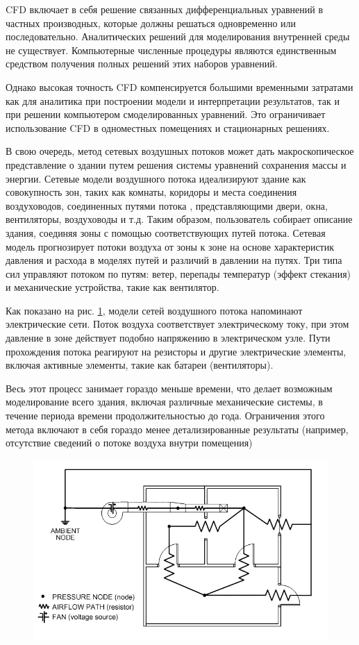 CFD включает в себя решение связанных дифференциальных уравнений в частных производных, которые должны решаться одновременно или последовательно. Аналитических решений для моделирования внутренней среды не существует. Компьютерные численные процедуры являются единственным средством получения полных решений этих наборов уравнений.

Однако высокая точность CFD компенсируется большими временными затратами как для аналитика при построении модели и интерпретации результатов, так и при решении компьютером смоделированных уравнений. Это ограничивает использование CFD в одноместных помещениях и стационарных решениях.

В свою очередь, метод сетевых воздушных потоков может дать макроскопическое представление о здании путем решения системы уравнений сохранения массы и энергии. Сетевые модели воздушного потока идеализируют здание как совокупность зон, таких как комнаты, коридоры и места соединения воздуховодов, соединенных путями потока , представляющими двери, окна, вентиляторы, воздуховоды и т.д. Таким образом, пользователь собирает описание здания, соединяя зоны с помощью соответствующих путей потока. Сетевая модель прогнозирует потоки воздуха от зоны к зоне на основе характеристик давления и расхода в моделях путей и различий в давлении на путях. Три типа сил управляют потоком по путям: ветер, перепады температур (эффект стекания) и механические устройства, такие как вентилятор.

Как показано на рис. \ref{NAF}, модели сетей воздушного потока напоминают электрические сети. Поток воздуха соответствует электрическому току, при этом давление в зоне действует подобно напряжению в электрическом узле. Пути прохождения потока реагируют на резисторы и другие электрические элементы, включая активные элементы, такие как батареи (вентиляторы).

Весь этот процесс занимает гораздо меньше времени, что делает возможным моделирование всего здания, включая различные механические системы, в течение периода времени продолжительностью до года. Ограничения этого метода включают в себя гораздо менее детализированные результаты (например, отсутствие сведений о потоке воздуха внутри помещения)

\begin{figure}[H]
\includegraphics[width=\textwidth]{images/NAF_example.png}
\caption{}
\label{NAF}
\end{figure}

